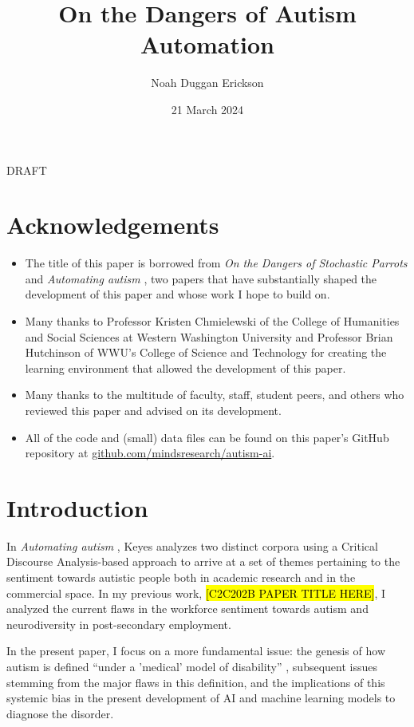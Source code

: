 \documentclass[letterpaper]{article}
\title{On the Dangers of Autism Automation}
\author{Noah Duggan Erickson}
\date{21 March 2024}
\begin{document}
\maketitle

{\Huge \centering DRAFT}

\section*{Acknowledgements}
\begin{itemize}
    \item The title of this paper is borrowed from \textit{On the Dangers of Stochastic Parrots} \cite{stopar} and \textit{Automating autism} \cite{auto}, two papers that have substantially shaped the development of this paper and whose work I hope to build on.
    \item Many thanks to Professor Kristen Chmielewski of the College of Humanities and Social Sciences at Western Washington University and Professor Brian Hutchinson of WWU's College of Science and Technology for creating the learning environment that allowed the development of this paper.
    \item Many thanks to the multitude of faculty, staff, student peers, and others who reviewed this paper and advised on its development.
    \item All of the code and (small) data files can be found on this paper's GitHub repository at \href{https://github.com/mindsresearch/autism-ai}{github.com/mindsresearch/autism-ai}.
\end{itemize}
\newpage
\tableofcontents
\newpage

\section{Introduction}
In \textit{Automating autism} \cite{auto}, Keyes analyzes two distinct corpora using a Critical Discourse Analysis-based approach to arrive at a set of themes pertaining to the sentiment towards autistic people both in academic research and in the commercial space. In my previous work, \hl{[C2C202B PAPER TITLE HERE]}, I analyzed the current flaws in the workforce sentiment towards autism and neurodiversity in post-secondary employment.

In the present paper, I focus on a more fundamental issue: the genesis of how autism is defined “under a 'medical' model of disability” \cite[p.~2]{auto}, subsequent issues stemming from the major flaws in this definition, and the implications of this systemic bias in the present development of AI and machine learning models to diagnose the disorder.
\end{document}
